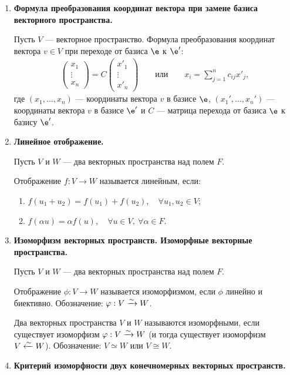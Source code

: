 \begin{enumerate}
\item \textbf{Формула преобразования координат вектора при замене базиса векторного пространства.}

Пусть $V$ --- векторное пространство. Формула преобразования координат вектора $v \in V$ при переходе от базиса $\e$ к $\e'$:
\begin{gather*}
\begin{pmatrix*}
x_1 \\
\vdots \\
x_n
\end{pmatrix*}
= C 
\begin{pmatrix*}
x'_1 \\
\vdots \\
x'_n
\end{pmatrix*}
\qquad \text{или} \qquad
x_i = \sum_{j = 1}^{n}c_{ij}x'_j,
\end{gather*}
где $(x_1, \ldots, x_n)$ --- координаты вектора $v$ в базисе $\e $, $(x_1', \ldots, x_n')$ --- координаты вектора $v$  в базисе $\e '$ и $C$ --- матрица перехода от базиса $\e $ к базису $\e '$.

\item \textbf{Линейное отображение.}

Пусть $V$ и $W$ --- два векторных пространства над полем $F$.

Отображение $f : V \rightarrow W$ называется линейным, если:
\begin{enumerate}
\item $f(u_1 + u_2) = f(u_1) + f(u_2), \quad \forall u_1, u_2 \in V$;
\item $f(\alpha u) = \alpha f(u), \quad \forall u \in V,\ \forall \alpha \in F$.
\end{enumerate}

\item \textbf{Изоморфизм векторных пространств. Изоморфные векторные пространства.}

Пусть $V$ и $W$ --- два векторных пространства над полем $F$.

Отображение $\phi: V \rightarrow W$ называется изоморфизмом, если $\phi$ линейно и биективно. Обозначение: $\varphi : V \xrightarrow{\sim}  W$.

Два векторных пространства $V$ и $W$ называются изоморфными, если существует изоморфизм $\varphi: V \xrightarrow{\sim} W$ (и тогда существует изоморфизм $V \xleftarrow{\sim} W$). Обозначение: $V \simeq W$ или $V \cong W$.

\item \textbf{Критерий изоморфности двух конечномерных векторных пространств.}


\end{enumerate}
